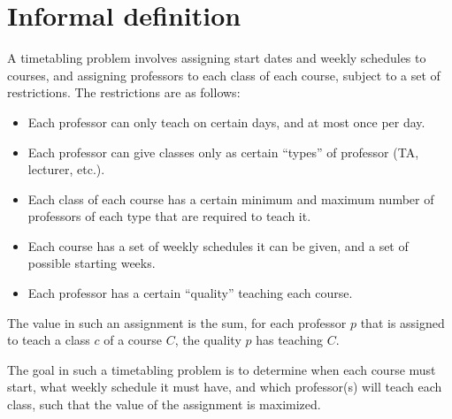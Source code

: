 \section{Informal definition}

A timetabling problem involves assigning start dates and weekly schedules to courses, and assigning professors to each class of each course, subject to a set of restrictions. The restrictions are as follows:

\begin{itemize}
\item Each professor can only teach on certain days, and at most once per day.
\item Each professor can give classes only as certain ``types'' of professor (TA, lecturer, etc.).
\item Each class of each course has a certain minimum and maximum number of professors of each type that are required to teach it.
\item Each course has a set of weekly schedules it can be given, and a set of possible starting weeks.
\item Each professor has a certain ``quality'' teaching each course.
\end{itemize}

The value in such an assignment is the sum, for each professor $p$ that is assigned to teach a class $c$ of a course $C$, the quality $p$ has teaching $C$.

The goal in such a timetabling problem is to determine when each course must start, what weekly schedule it must have, and which professor(s) will teach each class, such that the value of the assignment is maximized.

